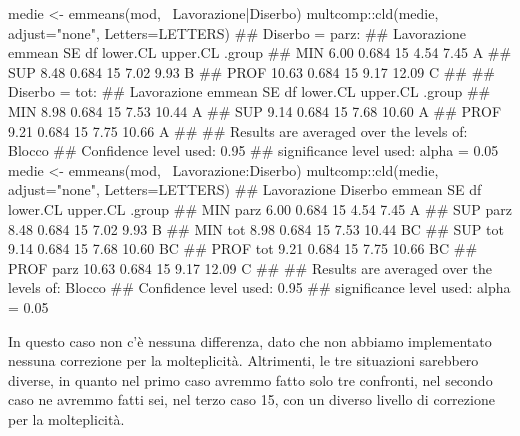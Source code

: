 \documentclass[a4paper,12pt,oneside]{book}
\newenvironment{Shaded}{}{}
\newcommand{\KeywordTok}[1]{#1}
\newcommand{\DataTypeTok}[1]{#1}
\newcommand{\StringTok}[1]{#1}
\newcommand{\CommentTok}[1]{#1}
\newcommand{\OperatorTok}[1]{#1}
\newcommand{\NormalTok}[1]{#1}
\begin{document}
\begin{Shaded}
\begin{Highlighting}[]
\NormalTok{medie <-}\StringTok{ }\KeywordTok{emmeans}\NormalTok{(mod, }\OperatorTok{~}\NormalTok{Lavorazione}\OperatorTok{|}\NormalTok{Diserbo)}
\NormalTok{multcomp}\OperatorTok{::}\KeywordTok{cld}\NormalTok{(medie, }\DataTypeTok{adjust=}\StringTok{"none"}\NormalTok{, }\DataTypeTok{Letters=}\NormalTok{LETTERS)}
\CommentTok{## Diserbo = parz:}
\CommentTok{##  Lavorazione emmean    SE df lower.CL upper.CL .group}
\CommentTok{##  MIN           6.00 0.684 15     4.54     7.45  A    }
\CommentTok{##  SUP           8.48 0.684 15     7.02     9.93   B   }
\CommentTok{##  PROF         10.63 0.684 15     9.17    12.09    C  }
\CommentTok{## }
\CommentTok{## Diserbo = tot:}
\CommentTok{##  Lavorazione emmean    SE df lower.CL upper.CL .group}
\CommentTok{##  MIN           8.98 0.684 15     7.53    10.44  A    }
\CommentTok{##  SUP           9.14 0.684 15     7.68    10.60  A    }
\CommentTok{##  PROF          9.21 0.684 15     7.75    10.66  A    }
\CommentTok{## }
\CommentTok{## Results are averaged over the levels of: Blocco }
\CommentTok{## Confidence level used: 0.95 }
\CommentTok{## significance level used: alpha = 0.05}
\NormalTok{medie <-}\StringTok{ }\KeywordTok{emmeans}\NormalTok{(mod, }\OperatorTok{~}\NormalTok{Lavorazione}\OperatorTok{:}\NormalTok{Diserbo)}
\NormalTok{multcomp}\OperatorTok{::}\KeywordTok{cld}\NormalTok{(medie, }\DataTypeTok{adjust=}\StringTok{"none"}\NormalTok{, }\DataTypeTok{Letters=}\NormalTok{LETTERS)}
\CommentTok{##  Lavorazione Diserbo emmean    SE df lower.CL upper.CL .group}
\CommentTok{##  MIN         parz      6.00 0.684 15     4.54     7.45  A    }
\CommentTok{##  SUP         parz      8.48 0.684 15     7.02     9.93   B   }
\CommentTok{##  MIN         tot       8.98 0.684 15     7.53    10.44   BC  }
\CommentTok{##  SUP         tot       9.14 0.684 15     7.68    10.60   BC  }
\CommentTok{##  PROF        tot       9.21 0.684 15     7.75    10.66   BC  }
\CommentTok{##  PROF        parz     10.63 0.684 15     9.17    12.09    C  }
\CommentTok{## }
\CommentTok{## Results are averaged over the levels of: Blocco }
\CommentTok{## Confidence level used: 0.95 }
\CommentTok{## significance level used: alpha = 0.05}
\end{Highlighting}
\end{Shaded}

In questo caso non c'è nessuna differenza, dato che non abbiamo implementato nessuna correzione per la molteplicità. Altrimenti, le tre situazioni sarebbero diverse, in quanto nel primo caso avremmo fatto solo tre confronti, nel secondo caso ne avremmo fatti sei, nel terzo caso 15, con un diverso livello di correzione per la molteplicità.
\end{document}

